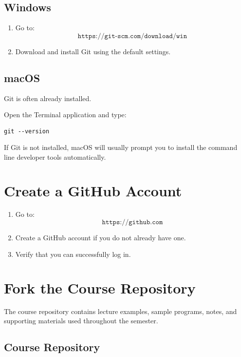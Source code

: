 \documentclass[11pt]{article}
\begin{document}
\subsection{Windows}

\begin{enumerate}
    \item Go to:
    \[
    \texttt{https://git-scm.com/download/win}
    \]

    \item Download and install Git using the default settings.
\end{enumerate}

\subsection{macOS}

Git is often already installed.

Open the Terminal application and type:

\begin{lstlisting}
git --version
\end{lstlisting}

If Git is not installed, macOS will usually prompt you to install the command line developer tools automatically.

\section{Create a GitHub Account}

\begin{enumerate}
    \item Go to:
    \[
    \texttt{https://github.com}
    \]

    \item Create a GitHub account if you do not already have one.

    \item Verify that you can successfully log in.
\end{enumerate}

\section{Fork the Course Repository}

The course repository contains lecture examples, sample programs, notes, and supporting materials used throughout the semester.

\subsection{Course Repository}
\end{document}
